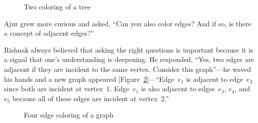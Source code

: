 \begin{figure}
\begin{center}


\caption{Two coloring of a tree}\label{10g4}
\end{center}
\end{figure}

Ajur grew more curious and asked, ``Can you also color edges? And if so, is there a concept of adjacent edges?'' 

Rishnak always believed that asking the right questions is important because it is a signal that one's understanding is deepening. He responded, ``Yes, two edges are adjacent if they are incident to the same vertex. Consider this graph''---he waved his hands and a new graph appeared [Figure~\ref{10g5}]---``Edge~$e_1$ is adjacent to edge~$e_2$ since both are incident at vertex~1. Edge~$e_1$ is also adjacent to edges~$e_3$, $e_4$, and~$e_5$ because all of these edges are incident at vertex~2.''

\begin{figure}
\begin{center}


\caption{Four edge coloring of a graph}\label{10g5}
\end{center}
\end{figure}

